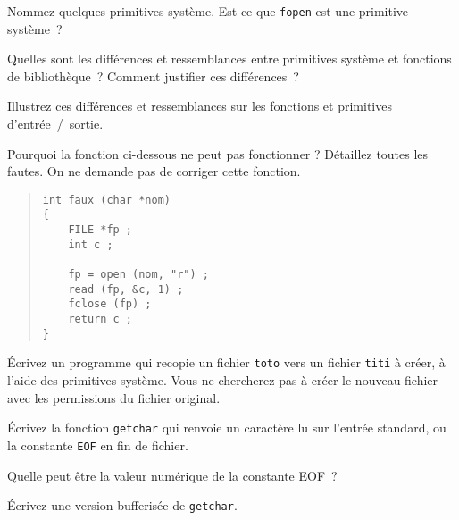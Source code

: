 %


% 


\question

Nommez quelques primitives système. Est-ce que {\tt fopen} est une
primitive système~?

Quelles sont les différences et ressemblances entre
primitives système et fonctions de bibliothèque~?
Comment justifier ces différences~?

Illustrez ces différences et ressemblances sur les
fonctions et primitives d'entrée~/~sortie.


\question

Pourquoi la fonction ci-dessous ne peut pas fonctionner ?  Détaillez
toutes les fautes.  On ne demande pas de corriger cette fonction.

\begin {quote}
\small
\begin {verbatim}
int faux (char *nom)
{
    FILE *fp ;
    int c ;

    fp = open (nom, "r") ;
    read (fp, &c, 1) ;
    fclose (fp) ;
    return c ;
}
\end{verbatim}
\end {quote}


\question
    \label {cp}

Écrivez un programme qui recopie un fichier {\tt toto} vers un fichier
{\tt titi} à créer, à l'aide des primitives système.
Vous ne chercherez
pas à créer le nouveau fichier avec les permissions du fichier original.


\question

Écrivez la fonction {\tt getchar} qui renvoie un caractère lu
sur l'entrée standard, ou la constante {\tt EOF} en fin de
fichier.

Quelle peut être la valeur numérique de la constante EOF~?


\question

Écrivez une version bufferisée de {\tt getchar}.


